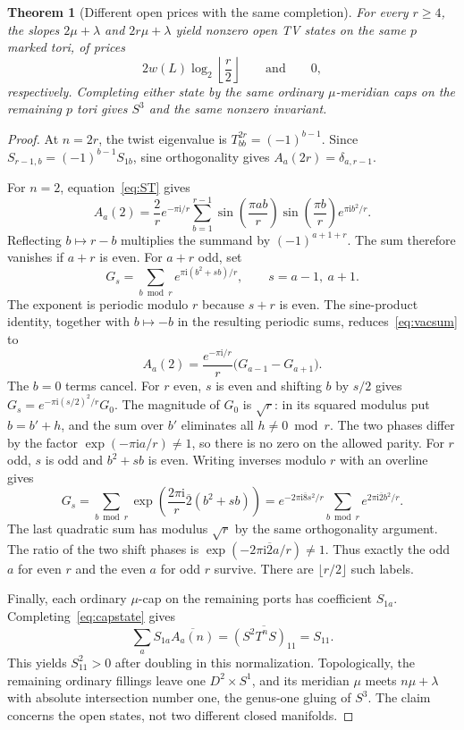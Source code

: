 \documentclass[11pt]{article}
\newtheorem{theorem}{Theorem}[section]
\theoremstyle{remark}
\newcommand{\iu}{\mathrm{i}}
\begin{document}
\begin{theorem}[Different open prices with the same completion]\label{thm:main}
For every \(r\geq 4\), the slopes \(2\mu+\lambda\) and \(2r\mu+\lambda\) yield nonzero open TV states on the same \(p\) marked tori, of prices
\[
 2w(L)\log_2\!\left\lfloor\frac r2\right\rfloor
 \qquad\text{and}\qquad 0,
\]
respectively. Completing either state by the same ordinary \(\mu\)-meridian caps on the remaining \(p\) tori gives \(S^3\) and the same nonzero invariant.
\end{theorem}
\begin{proof}
At \(n=2r\), the twist eigenvalue is \(T_{bb}^{2r}=(-1)^{b-1}\). Since \(S_{r-1,b}=(-1)^{b-1}S_{1b}\), sine orthogonality gives \(A_a(2r)=\delta_{a,r-1}\).

For \(n=2\), equation~\eqref{eq:ST} gives
\begin{equation}\label{eq:vacsum}
 A_a(2)=\frac2r e^{-\pi\iu/r}\sum_{b=1}^{r-1}
 \sin\!\left(\frac{\pi ab}{r}\right)
 \sin\!\left(\frac{\pi b}{r}\right)e^{\pi\iu b^2/r}.
\end{equation}
Reflecting \(b\mapsto r-b\) multiplies the summand by \((-1)^{a+1+r}\). The sum therefore vanishes if \(a+r\) is even. For \(a+r\) odd, set
\[
 G_s=\sum_{b\bmod r}e^{\pi\iu(b^2+sb)/r},
 \qquad s=a-1,\ a+1 .
\]
The exponent is periodic modulo \(r\) because \(s+r\) is even. The sine-product identity, together with \(b\mapsto-b\) in the resulting periodic sums, reduces~\eqref{eq:vacsum} to
\[
 A_a(2)=\frac{e^{-\pi\iu/r}}{r}\bigl(G_{a-1}-G_{a+1}\bigr).
\]
The \(b=0\) terms cancel. For \(r\) even, \(s\) is even and shifting \(b\) by \(s/2\) gives
\(G_s=e^{-\pi\iu(s/2)^2/r}G_0\).
The magnitude of \(G_0\) is \(\sqrt r\): in its squared modulus put \(b=b'+h\), and the sum over \(b'\) eliminates all \(h\ne0\bmod r\).
The two phases differ by the factor \(\exp(-\pi\iu a/r)\ne1\), so there is no zero on the allowed parity.
For \(r\) odd, \(s\) is odd and \(b^2+sb\) is even. Writing inverses modulo \(r\) with an overline gives
\[
 G_s=\sum_{b\bmod r}\exp\!\left(\frac{2\pi\iu}{r}\overline 2(b^2+sb)\right)
 =e^{-2\pi\iu\overline 8s^2/r}
   \sum_{b\bmod r}e^{2\pi\iu\overline2 b^2/r}.
\]
The last quadratic sum has modulus \(\sqrt r\) by the same orthogonality argument. The ratio of the two shift phases is \(\exp(-2\pi\iu\overline2a/r)\ne1\). Thus exactly the odd \(a\) for even \(r\) and the even \(a\) for odd \(r\) survive. There are \(\lfloor r/2\rfloor\) such labels.

Finally, each ordinary \(\mu\)-cap on the remaining ports has coefficient \(S_{1a}\). Completing~\eqref{eq:capstate} gives
\begin{equation}\label{eq:closure}
 \sum_a S_{1a}\overline{A_a(n)}
 =\overline{(S^2T^nS)_{11}}=S_{11}.
\end{equation}
This yields \(S_{11}^2>0\) after doubling in this normalization. Topologically, the remaining ordinary fillings leave one \(D^2\times S^1\), and its meridian \(\mu\) meets \(n\mu+\lambda\) with absolute intersection number one, the genus-one gluing of \(S^3\). The claim concerns the open states, not two different closed manifolds.
\end{proof}
\end{document}
